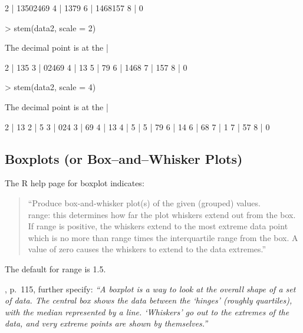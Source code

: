 \documentclass[12pt,letterpaper,final]{article}
\begin{document}
\begin{Schunk}
\begin{Soutput}
  2 | 13502469
  4 | 1379
  6 | 1468157
  8 | 0
\end{Soutput}
\begin{Sinput}
> stem(data2, scale = 2)
\end{Sinput}
\begin{Soutput}
  The decimal point is at the |

  2 | 135
  3 | 02469
  4 | 13
  5 | 79
  6 | 1468
  7 | 157
  8 | 0
\end{Soutput}
\begin{Sinput}
> stem(data2, scale = 4)
\end{Sinput}
\begin{Soutput}
  The decimal point is at the |

  2 | 13
  2 | 5
  3 | 024
  3 | 69
  4 | 13
  4 | 
  5 | 
  5 | 79
  6 | 14
  6 | 68
  7 | 1
  7 | 57
  8 | 0
\end{Soutput}
\end{Schunk}


\newpage


\subsection{Boxplots (or Box--and--Whisker Plots)}


The R help page for boxplot indicates:
\begin{quotation}
``Produce box-and-whisker plot(s) of the given (grouped) values. \\[0.2cm]
range: this determines how far the plot whiskers extend out from the box. 
If range is positive, the whiskers extend to the most extreme data point which 
is no more than range times the interquartile range from the box. 
A value of zero causes the whiskers to extend to the data extremes.''
\end{quotation}

The default for range is 1.5.


\cite{VR2002}, p.~115, further specify: 
{\it ``A boxplot is a way to look at the overall shape of a set of data.
The central box shows the data between the `hinges' (roughly quartiles),
with the median represented by a line. `Whiskers' go out to the extremes
of the data, and very extreme points are shown by themselves.''}
\end{document}
